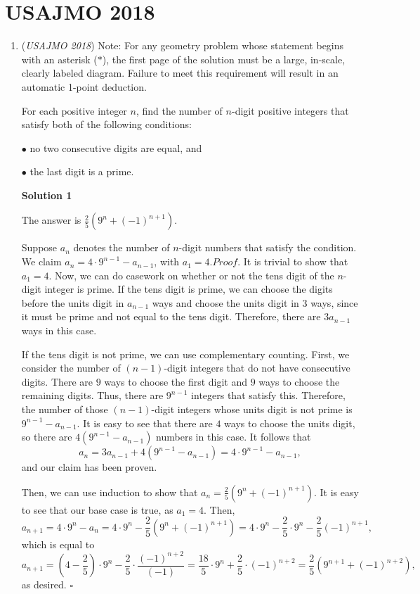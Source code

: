 \section{USAJMO 2018}
        \begin{enumerate}
        	\item (\textit{USAJMO 2018}) Note: For any geometry problem whose statement begins with an asterisk ($*$), the first page of the solution must be a large, in-scale, clearly labeled diagram. Failure to meet this requirement will result in an automatic 1-point deduction. 


 For each positive integer $n$, find the number of $n$-digit positive integers that satisfy both of the following conditions:


 $\bullet$ no two consecutive digits are equal, and


 $\bullet$ the last digit is a prime.


 



\textbf{Solution 1}

The answer is $\boxed{\frac{2}{5}\left(9^n+(-1)^{n+1}\right)}$.

 Suppose $a_n$ denotes the number of $n$-digit numbers that satisfy the condition. We claim $a_n=4\cdot 9^{n-1}-a_{n-1}$, with $a_1=4$.$\textit{Proof.}$ It is trivial to show that $a_1=4$. Now, we can do casework on whether or not the tens digit of the $n$-digit integer is prime. If the tens digit is prime, we can choose the digits before the units digit in $a_{n-1}$ ways and choose the units digit in $3$ ways, since it must be prime and not equal to the tens digit. Therefore, there are $3a_{n-1}$ ways in this case.

 If the tens digit is not prime, we can use complementary counting. First, we consider the number of $(n-1)$-digit integers that do not have consecutive digits. There are $9$ ways to choose the first digit and $9$ ways to choose the remaining digits. Thus, there are $9^{n-1}$ integers that satisfy this. Therefore, the number of those $(n-1)$-digit integers whose units digit is not prime is $9^{n-1}-a_{n-1}$. It is easy to see that there are $4$ ways to choose the units digit, so there are $4\left(9^{n-1}-a_{n-1}\right)$ numbers in this case. It follows that 
 \[a_n=3a_{n-1}+4\left(9^{n-1}-a_{n-1}\right)=4\cdot 9^{n-1}-a_{n-1},\]and our claim has been proven.

 Then, we can use induction to show that $a_n=\frac{2}{5}\left(9^n+(-1)^{n+1}\right)$. It is easy to see that our base case is true, as $a_1=4$. Then, 
 \[a_{n+1}=4\cdot 9^n-a_n=4\cdot 9^n-\frac{2}{5}\left(9^n+(-1)^{n+1}\right)=4\cdot 9^n-\frac{2}{5}\cdot 9^n-\frac{2}{5}(-1)^{n+1},\]which is equal to 
 \[a_{n+1}=\left(4-\frac{2}{5}\right)\cdot 9^n-\frac{2}{5}\cdot\frac{(-1)^{n+2}}{(-1)}=\frac{18}{5}\cdot 9^n+\frac{2}{5}\cdot(-1)^{n+2}=\frac{2}{5}\left(9^{n+1}+(-1)^{n+2}\right),\]as desired. $\square$


\end{enumerate}

